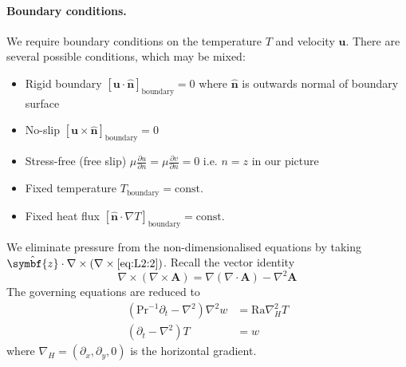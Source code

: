 \documentclass{jknotes}
\begin{document}
\paragraph{Boundary conditions.} We require boundary conditions on the
temperature $T$ and velocity $\symbf{u}$. There are several possible
conditions, which may be mixed:
\begin{itemize}
	\item Rigid boundary $\left[ \symbf{u}\cdot\hat{\symbf{n}}
		\right]_{\text{boundary}} = 0$ where $\hat{\symbf{n}}$ is outwards
		normal of boundary surface
	\item	No-slip $\left[ \symbf{u}\times\hat{\symbf{n}}
		\right]_{\text{boundary}} = 0$
	\item Stress-free (free slip) $\mu\frac{\partial u}{\partial n} = \mu
		\frac{\partial v}{\partial n} = 0$ i.e. $n=z$ in our picture
	\item Fixed temperature $T_{\text{boundary}} = \text{const.}$
	\item Fixed heat flux $\left[ \hat{\symbf{n}}\cdot\nabla
				T\right]_{\text{boundary}} = \text{const.}$
\end{itemize}

We eliminate pressure from the non-dimensionalised equations by taking
$\hat{\symbf{z}}\cdot\nabla \times (\nabla \times \eqref{eq:L2:2})$. Recall the
vector identity
\begin{equation}
	\nabla \times (\nabla \times \symbf{A}) = \nabla (\nabla \cdot \symbf{A})
	- \nabla^2 \symbf{A}
\end{equation}
The governing equations are reduced to
\begin{align}
	\left( \text{Pr}^{-1} \partial_t - \nabla^2 \right) \nabla^2 w &=
	\text{Ra} \nabla^2_H T \label{eq:L2:4}\\
	\left( \partial_t - \nabla^2 \right) T &= w \label{eq:L2:5}
\end{align}
where $\nabla_H = (\partial_x, \partial_y, 0)$ is the horizontal gradient.
\end{document}

